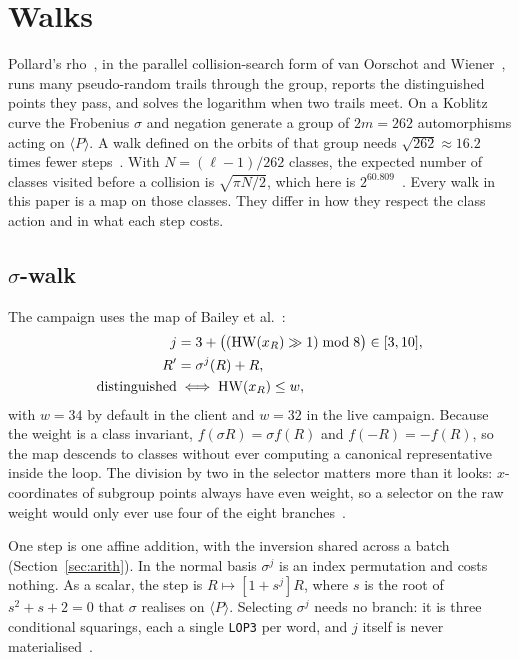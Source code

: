 \section{Walks}
\label{sec:walk}

Pollard's rho~\cite{pollard1978}, in the parallel collision-search
form of van Oorschot and Wiener~\cite{vanoorschot1999}, runs many
pseudo-random trails through the group, reports the distinguished
points they pass, and solves the logarithm when two trails meet. On a
Koblitz curve the Frobenius $\sigma$ and negation generate a group of
$2m=262$ automorphisms acting on $\langle P\rangle$. A walk defined on
the orbits of that group needs $\sqrt{262}\approx16.2$ times fewer
steps~\cite{wienerzuccherato1998,glv2000,duursma1999}. With
$N=(\ell-1)/262$ classes, the expected number of classes visited
before a collision is $\sqrt{\pi N/2}$, which here is
$2^{60.809}$~. Every walk in this
paper is a map on those classes. They differ in how they respect the
class action and in what each step costs.

\subsection{$\sigma$-walk}
\label{sec:walk-sigma}

The campaign uses the map of Bailey et al.~\cite{bailey2009}:
\begin{align*}
  j &= 3 + \bigl((\operatorname{HW}(x_R) \gg 1) \bmod 8\bigr) \in [3,10],\\
  R' &= \sigma^j(R) + R,\\
  \text{distinguished} &\iff \operatorname{HW}(x_R)\le w,
\end{align*}
with $w=34$ by default in the client and $w=32$ in the live campaign.
Because the weight is a class invariant, $f(\sigma R)=\sigma f(R)$ and
$f(-R)=-f(R)$, so the map descends to classes without ever computing a
canonical representative inside the loop. The division by two in the
selector matters more than it looks: $x$-coordinates of subgroup
points always have even weight, so a selector on the raw weight would
only ever use four of the eight branches~.

One step is one affine addition, with the inversion shared across a
batch (Section~\ref{sec:arith}). In the normal basis $\sigma^j$ is an
index permutation and costs nothing. As a scalar, the step is
$R\mapsto[1+s^j]R$, where $s$ is the root of $s^2+s+2=0$ that $\sigma$
realises on $\langle P\rangle$. Selecting $\sigma^j$ needs no branch:
it is three conditional squarings, each a single \texttt{LOP3} per
word, and $j$ itself is never materialised~.


